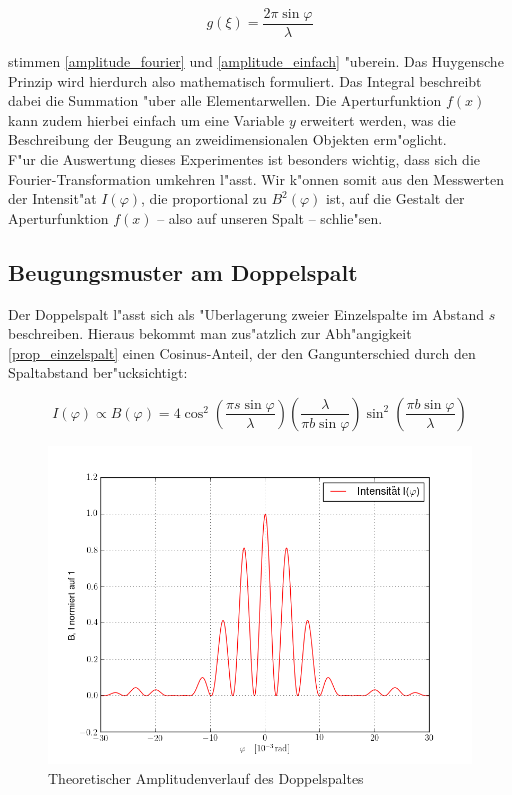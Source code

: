 		\begin{equation}
			g(\xi) = \frac{2 \pi \sin{\varphi}}{\lambda}
		\end{equation}

		stimmen \ref{amplitude_fourier} und \ref{amplitude_einfach} "uberein.
		Das Huygensche Prinzip wird hierdurch also mathematisch formuliert.
		Das Integral beschreibt dabei die Summation "uber alle Elementarwellen.
		Die Aperturfunktion $f(x)$ kann zudem hierbei einfach um eine Variable $y$ erweitert werden,
		was die Beschreibung der Beugung an zweidimensionalen Objekten erm"oglicht. \\
		F"ur die Auswertung dieses Experimentes ist besonders wichtig, dass sich die Fourier-Transformation umkehren l"asst.
		Wir k"onnen somit aus den Messwerten der Intensit"at $I(\varphi)$,
		die proportional zu $B^2(\varphi)$ ist, auf die Gestalt der Aperturfunktion $f(x)$
		--  also auf unseren Spalt -- schlie"sen.
		
	\subsection{Beugungsmuster am Doppelspalt}
		\label{sec:muster_doppelspalt}

		Der Doppelspalt l"asst sich als "Uberlagerung zweier Einzelspalte im Abstand $s$ beschreiben.
		Hieraus bekommt man zus"atzlich zur Abh"angigkeit \ref{prop_einzelspalt} einen Cosinus-Anteil,
		der den Gangunterschied durch den Spaltabstand ber"ucksichtigt:

		\begin{equation}
			I(\varphi) \propto B(\varphi) = 
			4 \cos^2{\left( \frac{\pi s \sin{\varphi}}{\lambda} \right)}
			\left( \frac{\lambda}{\pi b \sin{\varphi}} \right)
			\sin^2{\left( \frac{\pi b \sin{\varphi}}{\lambda} \right)}
			\label{prop_doppelspalt}
		\end{equation}

		\begin{figure}[h]
			\centering
			\includegraphics[width = 15cm]{theorie_2.png}
			\caption{Theoretischer Amplitudenverlauf des Doppelspaltes}
			\label{theoriekurve_doppelspalt}
		\end{figure}
